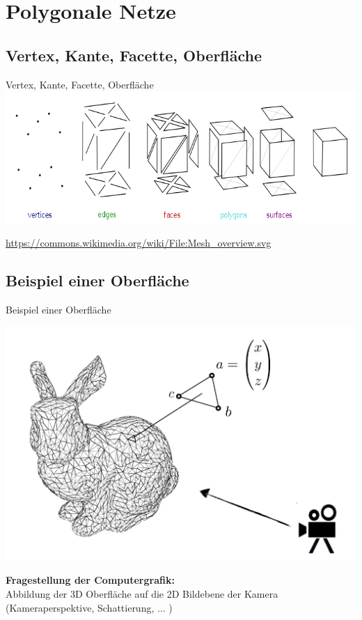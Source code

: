\documentclass[10pt,aspectratio=169]{beamer}
\begin{document}
  \section{Polygonale Netze}
  \subsection{Vertex, Kante, Facette, Oberfläche}
  \begin{frame}{Vertex, Kante, Facette, Oberfläche}
    \hspace{0.65cm}\includegraphics[scale=0.5]{mesh}
    \begin{center}
      \footnotesize \url{https://commons.wikimedia.org/wiki/File:Mesh_overview.svg}  
    \end{center}
  \end{frame}

  \subsection{Beispiel einer Oberfläche}
  \begin{frame}{Beispiel einer Oberfläche}
    \begin{center}
      \includegraphics[scale=0.125]{bunny}
    \end{center}
    \textbf{Fragestellung der Computergrafik:}\\
    Abbildung der 3D Oberfläche auf die 2D Bildebene der Kamera\\
    (Kameraperspektive, Schattierung, ... )
  \end{frame}
\end{document}

